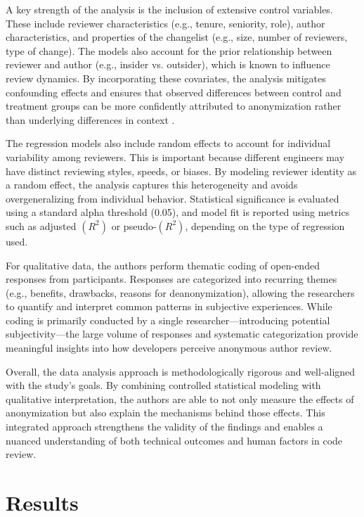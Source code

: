 A key strength of the analysis is the inclusion of extensive control variables. These include reviewer characteristics (e.g., tenure, seniority, role), author characteristics, and properties of the changelist (e.g., size, number of reviewers, type of change). The models also account for the prior relationship between reviewer and author (e.g., insider vs. outsider), which is known to influence review dynamics. By incorporating these covariates, the analysis mitigates confounding effects and ensures that observed differences between control and treatment groups can be more confidently attributed to anonymization rather than underlying differences in context .

The regression models also include random effects to account for individual variability among reviewers. This is important because different engineers may have distinct reviewing styles, speeds, or biases. By modeling reviewer identity as a random effect, the analysis captures this heterogeneity and avoids overgeneralizing from individual behavior. Statistical significance is evaluated using a standard alpha threshold (0.05), and model fit is reported using metrics such as adjusted $(R^2)$ or pseudo-$(R^2)$, depending on the type of regression used.

For qualitative data, the authors perform thematic coding of open-ended responses from participants. Responses are categorized into recurring themes (e.g., benefits, drawbacks, reasons for deanonymization), allowing the researchers to quantify and interpret common patterns in subjective experiences. While coding is primarily conducted by a single researcher—introducing potential subjectivity—the large volume of responses and systematic categorization provide meaningful insights into how developers perceive anonymous author review.

Overall, the data analysis approach is methodologically rigorous and well-aligned with the study’s goals. By combining controlled statistical modeling with qualitative interpretation, the authors are able to not only measure the effects of anonymization but also explain the mechanisms behind those effects. This integrated approach strengthens the validity of the findings and enables a nuanced understanding of both technical outcomes and human factors in code review.

\section{Results}

